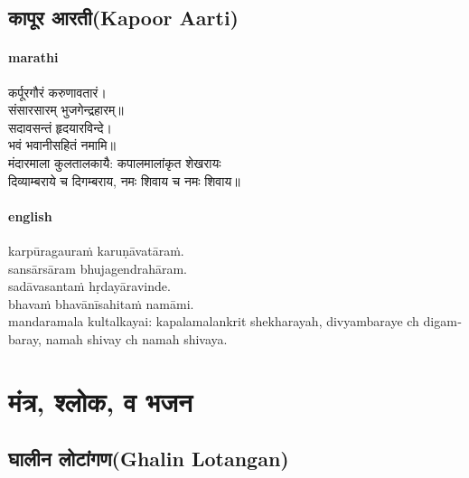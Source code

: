 \documentclass[letterpaper,twocolumn,openany,nodeprecatedcode]{dndbook}
\begin{document}
\chapter{कापूर आरती(Kapoor Aarti)}
\begin{flushleft}
  \subsection*{marathi}
  कर्पूरगौरं करुणावतारं।\\
  संसारसारम् भुजगेन्द्रहारम्॥ \\
  सदावसन्तं हृदयारविन्दे।\\
  भवं भवानीसहितं नमामि॥\\
  मंदारमाला कुलतालकायै: कपालमालांकृत शेखरायः \\
  दिव्याम्बराये च दिगम्बराय, नमः शिवाय च नमः शिवाय॥ \\
  \pagebreak
  \subsection*{english}
  {\englishfont
  \textenglish{
    karpūragauraṁ karuṇāvatāraṁ. \\
    sansārsāram bhujagendrahāram. \\
    sadāvasantaṁ hṛdayāravinde. \\
    bhavaṁ bhavānīsahitaṁ namāmi. \\
    mandaramala kultalkayai: kapalamalankrit shekharayah, divyambaraye ch digambaray, namah shivay ch namah shivaya. \\
  }}
\end{flushleft}
\pagebreak
\part{मंत्र, श्लोक, व भजन}
\chapter{घालीन लोटांगण(Ghalin Lotangan)}
\end{document}
